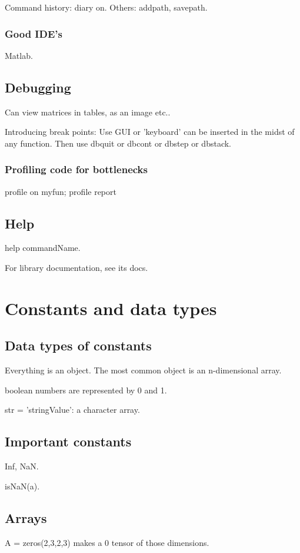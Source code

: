 \documentclass[oneside, article]{memoir}
\begin{document}
Command history: diary on. Others: addpath, savepath.

\subsubsection{Good IDE's}
Matlab.

\subsection{Debugging}
Can view matrices in tables, as an image etc..

Introducing break points: Use GUI or 'keyboard' can be inserted in the midst of any function. Then use dbquit or dbcont or dbstep or dbstack.

\subsubsection{Profiling code for bottlenecks}
profile on
myfun;
profile report

\subsection{Help}
help commandName.

For library documentation, see its docs.

\section{Constants and data types}
\subsection{Data types of constants}
Everything is an object. The most common object is an n-dimensional array.

boolean numbers are represented by 0 and 1.

str = 'stringValue': a character array.

\subsection{Important constants}
Inf, NaN.

isNaN(a).

\subsection{Arrays}
A = zeros(2,3,2,3) makes a 0 tensor of those dimensions.
\end{document}
